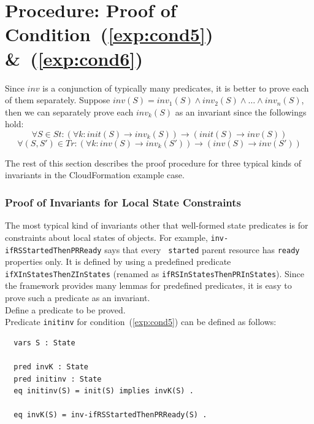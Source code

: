 \documentclass[12pt]{report}
\newcommand{\ra}{\rightarrow}
\begin{document}
\section{Procedure: Proof of Condition~(\ref{exp:cond5}) \&~(\ref{exp:cond6})}
\label{sec:invariant}
Since $inv$ is a conjunction of typically many predicates, it is
better to prove each of them separately. Suppose $inv(S) =
inv_1(S)\land inv_2(S)\land\dots\land inv_n(S)$, then we can
separately prove each $inv_k(S)$ as an invariant since the followings
hold:
\[\forall S\in St: (\forall k:init(S)\ra inv_k(S))\ra(init(S)\ra inv(S))\]
\[\forall (S,S')\in Tr: (\forall k:inv(S)\ra inv_k(S'))\ra(inv(S)\ra inv(S'))\]

\vspace{0.3cm}
The rest of this section describes the proof procedure for three
typical kinds of invariants in the CloudFormation example case.

\subsubsection*{Proof of Invariants for Local State Constraints}
The most typical kind of invariants other that well-formed state
predicates is for constraints about local states of objects.  For
example, {\tt inv-ifRSStartedThenPRReady} says that every {\tt
  started} parent resource has {\tt ready} properties only.  It is
defined by using a predefined predicate {\tt ifXInStatesThenZInStates}
(renamed as {\tt ifRSInStatesThenPRInStates}). Since the framework
provides many lemmas for predefined predicates, it is easy to
prove such a predicate as an invariant. \\

 Define a predicate to be proved. \\ Predicate
         {\tt initinv} for condition~(\ref{exp:cond5}) can be defined
         as follows:
\begin{verbatim}
  vars S : State

  pred invK : State
  pred initinv : State
  eq initinv(S) = init(S) implies invK(S) .

  eq invK(S) = inv-ifRSStartedThenPRReady(S) .
\end{verbatim}
\end{document}
